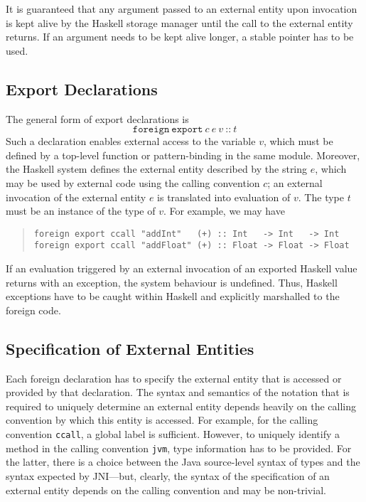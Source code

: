 \documentclass[a4paper,twosides]{article}
\newcommand{\code}[1]{\texttt{#1}}      %
\begin{document}
It is guaranteed that any argument passed to an external entity upon
invocation is kept alive by the Haskell storage manager until the call to the
external entity returns.  If an argument needs to be kept alive longer, a
stable pointer has to be used.

\subsection{Export Declarations}

The general form of export declarations is
%
\[
\code{foreign}~\code{export}~c~e~v~\code{{::}}~t
\]
%
Such a declaration enables external access to the variable $v$, which must be
defined by a top-level function or pattern-binding in the same module.
Moreover, the Haskell system defines the external entity described by the
string $e$, which may be used by external code using the calling convention
$c$; an external invocation of the external entity $e$ is translated into
evaluation of $v$.  The type $t$ must be an instance of the type of $v$.  For
example, we may have
%
\begin{quote}
\begin{verbatim}
foreign export ccall "addInt"   (+) :: Int   -> Int   -> Int
foreign export ccall "addFloat" (+) :: Float -> Float -> Float
\end{verbatim}
\end{quote}

If an evaluation triggered by an external invocation of an exported Haskell
value returns with an exception, the system behaviour is undefined.  Thus,
Haskell exceptions have to be caught within Haskell and explicitly marshalled
to the foreign code.

\subsection{Specification of External Entities}
\label{sec:extent}

Each foreign declaration has to specify the external entity that is accessed
or provided by that declaration.  The syntax and semantics of the notation
that is required to uniquely determine an external entity depends heavily on
the calling convention by which this entity is accessed.  For example, for the
calling convention \code{ccall}, a global label is sufficient.  However, to
uniquely identify a method in the calling convention \code{jvm}, type
information has to be provided.  For the latter, there is a choice between the
Java source-level syntax of types and the syntax expected by JNI---but,
clearly, the syntax of the specification of an external entity depends on the
calling convention and may be non-trivial.
\end{document}

